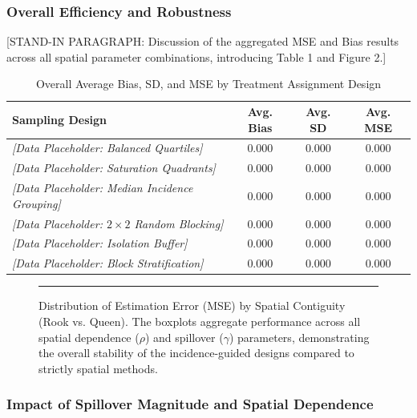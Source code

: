 \documentclass[11pt]{article}
\begin{document}
\subsubsection{Overall Efficiency and Robustness}

[STAND-IN PARAGRAPH: Discussion of the aggregated MSE and Bias results across all spatial parameter combinations, introducing Table 1 and Figure 2.]

\begin{table}[htbp]
    \centering
    \caption{Overall Average Bias, SD, and MSE by Treatment Assignment Design}
    \label{tab:overall_results}
    \begin{tabular}{lccc}
        \toprule
        \textbf{Sampling Design} & \textbf{Avg. Bias} & \textbf{Avg. SD} & \textbf{Avg. MSE} \\
        \midrule
        \textit{[Data Placeholder: Balanced Quartiles]} & 0.000 & 0.000 & 0.000 \\
        \textit{[Data Placeholder: Saturation Quadrants]} & 0.000 & 0.000 & 0.000 \\
        \textit{[Data Placeholder: Median Incidence Grouping]} & 0.000 & 0.000 & 0.000 \\
        \textit{[Data Placeholder: $2 \times 2$ Random Blocking]} & 0.000 & 0.000 & 0.000 \\
        \textit{[Data Placeholder: Isolation Buffer]} & 0.000 & 0.000 & 0.000 \\
        \textit{[Data Placeholder: Block Stratification]} & 0.000 & 0.000 & 0.000 \\
        \bottomrule
    \end{tabular}
\end{table}

\begin{figure}[htbp]
    \centering
    \rule{0.8\textwidth}{6cm} %
    \caption{Distribution of Estimation Error (MSE) by Spatial Contiguity (Rook vs. Queen). The boxplots aggregate performance across all spatial dependence ($\rho$) and spillover ($\gamma$) parameters, demonstrating the overall stability of the incidence-guided designs compared to strictly spatial methods.}
    \label{fig:mse_boxplot}
\end{figure}

\subsubsection{Impact of Spillover Magnitude and Spatial Dependence}
\end{document}
